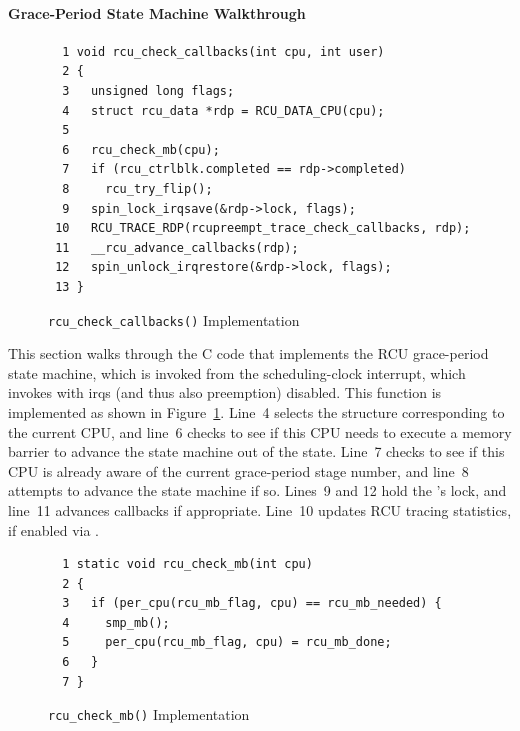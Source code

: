 \paragraph{Grace-Period State Machine Walkthrough}
\label{app:rcuimpl:Grace-Period State Machine Walkthrough}

\begin{figure}[tbp]
{ \scriptsize
\begin{verbatim}
  1 void rcu_check_callbacks(int cpu, int user)
  2 {
  3   unsigned long flags;
  4   struct rcu_data *rdp = RCU_DATA_CPU(cpu);
  5
  6   rcu_check_mb(cpu);
  7   if (rcu_ctrlblk.completed == rdp->completed)
  8     rcu_try_flip();
  9   spin_lock_irqsave(&rdp->lock, flags);
 10   RCU_TRACE_RDP(rcupreempt_trace_check_callbacks, rdp);
 11   __rcu_advance_callbacks(rdp);
 12   spin_unlock_irqrestore(&rdp->lock, flags);
 13 }
\end{verbatim}
}
\caption{{\tt rcu\_check\_callbacks()} Implementation}
\label{fig:app:rcuimpl:rcu_check_callbacks() Implementation}
\end{figure}

This section walks through the C code that implements the RCU
grace-period state machine, which is invoked from the scheduling-clock
interrupt, which invokes  with
irqs (and thus also preemption) disabled.
This function is implemented as shown in
Figure~\ref{fig:app:rcuimpl:rcu_check_callbacks() Implementation}.
Line~4 selects the  structure corresponding
to the current CPU, and line~6 checks to see if this CPU needs
to execute a memory barrier to advance the state machine out of the
 state.
Line~7 checks to see if this CPU is already aware of the
current grace-period stage number, and line~8 attempts to advance the
state machine if so.
Lines~9 and 12 hold the 's lock, and
line~11 advances callbacks if appropriate.
Line~10 updates RCU tracing statistics, if enabled via
.

\begin{figure}[tbp]
{ \scriptsize
\begin{verbatim}
  1 static void rcu_check_mb(int cpu)
  2 {
  3   if (per_cpu(rcu_mb_flag, cpu) == rcu_mb_needed) {
  4     smp_mb();
  5     per_cpu(rcu_mb_flag, cpu) = rcu_mb_done;
  6   }
  7 }
\end{verbatim}
}
\caption{{\tt rcu\_check\_mb()} Implementation}
\label{fig:app:rcuimpl:rcu_check_mb() Implementation}
\end{figure}

